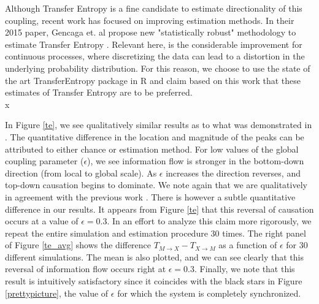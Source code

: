 \documentclass[conference]{IEEEtran}
\begin{document}
\noindent Although Transfer Entropy is a fine candidate to estimate directionality of this coupling, recent work has focused on improving estimation methods. In their 2015 paper, Gencaga et. al propose new "statistically robust" methodology to estimate Transfer Entropy \cite{recipe}. Relevant here, is the considerable improvement for continuous processes, where discretizing the data can lead to a distortion in the underlying probability distribution. For this reason, we choose to use the state of the art TransferEntropy package in R and claim based on this work that these estimates of Transfer Entropy are to be preferred. \\
x

\noindent In Figure \ref{te}, we see qualitatively similar results as to what was demonstrated in \cite{Walker}. The quantitative difference in the location and magnitude of the peaks can be attributed to either chance or estimation method. For low values of the global coupling parameter ($\epsilon$), we see information flow is stronger in the bottom-down direction (from local to global scale). As $\epsilon$ increases the direction reverses, and top-down causation begins to dominate. We note again that we are qualitatively in agreement with the previous work \cite{Walker}. There is however a subtle quantitative difference in our results. It appears from Figure \ref{te} that this reversal of causation occurs at a value of $\epsilon = 0.3$. In an effort to analyze this claim more rigorously, we repeat the entire simulation and estimation procedure $30$ times. The right panel of Figure \ref{te_avg} shows the difference $T_{M\rightarrow X} - T_{X \rightarrow M}$ as a function of $\epsilon$ for 30 different simulations. The mean is also plotted, and we can see clearly that this reversal of information flow occurs right at $\epsilon = 0.3$. Finally, we note that this result is intuitively satisfactory since it coincides with the black stars in Figure \ref{prettypicture}, the value of $\epsilon$ for which the system is completely synchronized.
\end{document}
